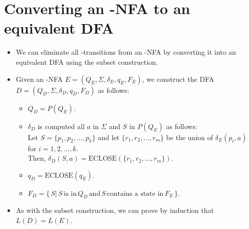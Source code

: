 \documentclass[]{article}
\begin{document}
\section{Converting an \textepsilon-NFA to an equivalent DFA}
  \begin{itemize}
    \item We can eliminate all \textepsilon-transitions from an \textepsilon-NFA
          by converting it into an equivalent DFA using the subset construction.
    \item Given an \textepsilon-NFA $E = (Q_E, \Sigma, \delta_E, q_E, F_E)$, we
          construct the DFA $D = (Q_D, \Sigma, \delta_D, q_D, F_D)$ as follows:
      \begin{itemize}
        \item $Q_D = P(Q_E)$.
        \item $\delta_D$ is computed all $a$ in $\Sigma$ and $S$ in $P(Q_E)$ as
              follows: \\
              Let $S = \{p_1, p_2, \ldots, p_k\}$ and let
              $\{r_1,r_2,\ldots,r_m\}$ be the union of $\delta_E(p_i, a)$ for
              $i = 1, 2, \ldots, k$. \\
              Then, $\delta_D(S,a) = \text{ECLOSE}(\{r_1,r_2,\ldots,r_m\})$.
        \item $q_D = \text{ECLOSE}(q_E)$.
        \item $F_D = \{ \, S | \, S \, \text{is in} \, Q_D \, \text{and} \, S \,
              \text{contains a state in} \, F_E \, \}$.
      \end{itemize}
    \item As with the subset construction, we can prove by induction that
          $L(D) = L(E)$.
  \end{itemize}
\end{document}

